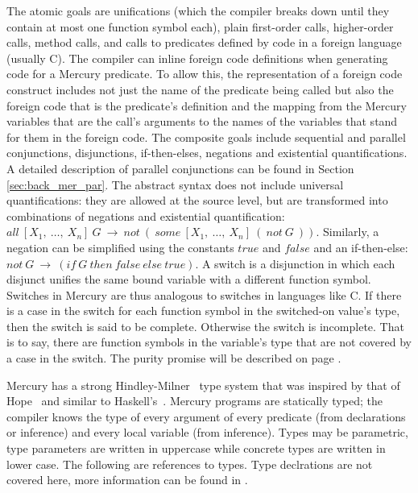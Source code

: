 \noindent
The atomic goals are unifications
(which the compiler breaks down until they contain
at most one function symbol each),
plain first-order calls,
higher-order calls,
method calls,
and calls to predicates defined by code in a foreign language (usually C).
The compiler can inline foreign code definitions when generating code
for a Mercury predicate.
To allow this, the representation of a foreign code construct includes
not just the name of the predicate being called
but also the foreign code that is the predicate's definition
and the mapping from the Mercury variables that are the call's arguments
to the names of the variables that stand for them in the foreign code.
The composite goals include
sequential and parallel conjunctions,
disjunctions, if-then-elses, negations and existential quantifications.
A detailed description of parallel conjunctions can be found in Section
\ref{sec:back_mer_par}.
The abstract syntax does not include universal quantifications:
they are allowed at the source level,
but are transformed into combinations of negations and existential quantification:
$all~[X_1,~\ldots,~X_n]~G~\rightarrow~not~(~some~[X_1,~\ldots,~X_n]~(~not~G~))$.
Similarly,
a negation can be simplified using the constants $true$ and $false$ and an
if-then-else:
$not~G~\rightarrow~(if~G~then~false~else~true)$.
A switch is a disjunction in which
each disjunct unifies the same bound variable
with a different function symbol.
Switches in Mercury are thus analogous to switches in languages like C.
If there is a case in the switch for each function symbol in the
switched-on value's type, then the switch is said to be complete.
Otherwise the switch is incomplete.
That is to say,
there are function symbols in the variable's type that are not covered
by a case in the switch.
The purity promise will be described on page \pageref{page:purity}.


Mercury has a strong Hindley-Milner~\citep{hindley69:types,milner78:types} type
system that was inspired by that of Hope~\citep{hope_types}
and similar to Haskell's~\citep{haskell98}.
Mercury programs are statically typed; the compiler knows the type of every
argument of every predicate (from declarations or inference) and every local
variable (from inference).
Types may be parametric,
type parameters are written in uppercase while
concrete types are written in lower case.
The following are references to types.
Type declrations are not covered here,
more information can be found in \citet{mercury_refman}.

